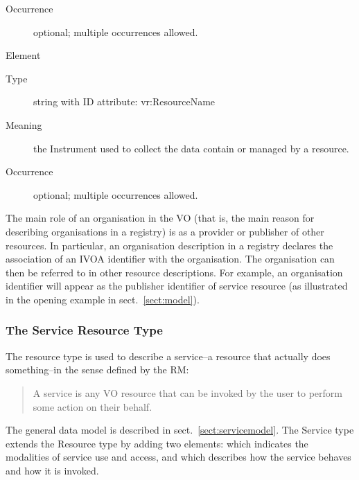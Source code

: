 \documentclass[11pt,a4paper]{ivoa}
\begin{document}
\begin{generated}
\begin{bigdescription}
\begin{description}
\item[Occurrence] optional; multiple occurrences allowed.

\end{description}
\item[Element \xmlel{instrument}]
\begin{description}
\item[Type] string with ID attribute: vr:ResourceName
\item[Meaning] 
                       the Instrument used to collect the data contain or 
                       managed by a resource.  
                     
\item[Occurrence] optional; multiple occurrences allowed.

\end{description}


\end{bigdescription}\endgroup

\endgroup
\end{generated}


The main role of an organisation in the VO (that is, the main reason
for describing organisations in a registry) is as a provider or
publisher of other resources.  In particular, an organisation
description in a registry declares the association of an IVOA
identifier with the organisation.  The
organisation can then be referred to in other resource descriptions.
For example, an organisation identifier will appear as the publisher
identifier of service resource (as illustrated in the opening
example in sect.~\ref{sect:model}).


\subsubsection{The Service Resource Type}


The  resource type is used to describe a service--a resource
that actually does something--in the sense defined by the
RM:

\begin{quotation}
A service is any VO resource that can be invoked by the user to
perform some action on their behalf.  
\end{quotation}


The general data model is described in sect.~\ref{sect:servicemodel}.
The Service type extends the Resource type by adding two elements:
 which indicates the modalities of service use and access, and
 which describes how the service behaves and how it is
invoked.
\end{document}
